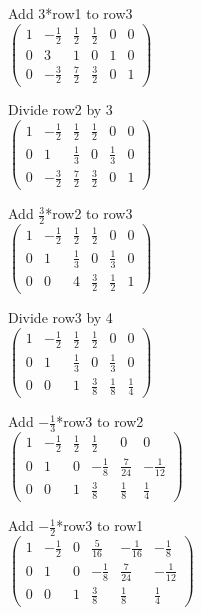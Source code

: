 \documentclass{article}
\begin{document}
Add 3*row1 to row3\\
$
\left (
    \begin{matrix}
        1 & -\frac{1}{2} & \frac{1}{2} & \frac{1}{2} & 0 & 0\\
        0 & 3 & 1 & 0 & 1 & 0\\
        0 & -\frac{3}{2} & \frac{7}{2} & \frac{3}{2} & 0 & 1
    \end{matrix}
\right )
$

Divide row2 by 3\\
$
\left (
    \begin{matrix}
        1 & -\frac{1}{2} & \frac{1}{2} & \frac{1}{2} & 0 & 0\\
        0 & 1 & \frac{1}{3} & 0 & \frac{1}{3} & 0\\
        0 & -\frac{3}{2} & \frac{7}{2} & \frac{3}{2} & 0 & 1
    \end{matrix}
\right )
$

Add $\frac{3}{2}$*row2 to row3\\
$
\left (
    \begin{matrix}
        1 & -\frac{1}{2} & \frac{1}{2} & \frac{1}{2} & 0 & 0\\
        0 & 1 & \frac{1}{3} & 0 & \frac{1}{3} & 0\\
        0 & 0 & 4 & \frac{3}{2} & \frac{1}{2} & 1
    \end{matrix}
\right )
$

Divide row3 by 4\\
$
\left (
    \begin{matrix}
        1 & -\frac{1}{2} & \frac{1}{2} & \frac{1}{2} & 0 & 0\\
        0 & 1 & \frac{1}{3} & 0 & \frac{1}{3} & 0\\
        0 & 0 & 1 & \frac{3}{8} & \frac{1}{8} & \frac{1}{4}
    \end{matrix}
\right )
$

Add $-\frac{1}{3}$*row3 to row2\\
$
\left (
    \begin{matrix}
        1 & -\frac{1}{2} & \frac{1}{2} & \frac{1}{2} & 0 & 0\\
        0 & 1 & 0 & -\frac{1}{8} & \frac{7}{24} & -\frac{1}{12}\\
        0 & 0 & 1 & \frac{3}{8} & \frac{1}{8} & \frac{1}{4}
    \end{matrix}
\right )
$

Add $-\frac{1}{2}$*row3 to row1\\
$
\left (
    \begin{matrix}
        1 & -\frac{1}{2} & 0 & \frac{5}{16} & -\frac{1}{16} & -\frac{1}{8}\\
        0 & 1 & 0 & -\frac{1}{8} & \frac{7}{24} & -\frac{1}{12}\\
        0 & 0 & 1 & \frac{3}{8} & \frac{1}{8} & \frac{1}{4}
    \end{matrix}
\right )
$
\end{document}
